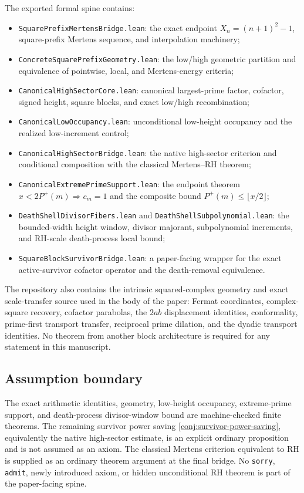 The exported formal spine contains:
\begin{itemize}
\item \texttt{SquarePrefixMertensBridge.lean}: the exact endpoint $X_n=(n+1)^2-1$, square-prefix Mertens sequence, and interpolation machinery;
\item \texttt{ConcreteSquarePrefixGeometry.lean}: the low/high geometric partition and equivalence of pointwise, local, and Mertens-energy criteria;
\item \texttt{CanonicalHighSectorCore.lean}: canonical largest-prime factor, cofactor, signed height, square blocks, and exact low/high recombination;
\item \texttt{CanonicalLowOccupancy.lean}: unconditional low-height occupancy and the realized low-increment control;
\item \texttt{CanonicalHighSectorBridge.lean}: the native high-sector criterion and conditional composition with the classical Mertens--RH theorem;
\item \texttt{CanonicalExtremePrimeSupport.lean}: the endpoint theorem $x<2P^+(m)\Rightarrow c_m=1$ and the composite bound $P^+(m)\le\lfloor x/2\rfloor$;
\item \texttt{DeathShellDivisorFibers.lean} and \texttt{DeathShellSubpolynomial.lean}: the bounded-width height window, divisor majorant, subpolynomial increments, and RH-scale death-process local bound;
\item \texttt{SquareBlockSurvivorBridge.lean}: a paper-facing wrapper for the exact active-survivor cofactor operator and the death-removal equivalence.
\end{itemize}

The repository also contains the intrinsic squared-complex geometry and exact scale-transfer source used in the body of the paper: Fermat coordinates, complex-square recovery, cofactor parabolas, the $2ab$ displacement identities, conformality, prime-first transport transfer, reciprocal prime dilation, and the dyadic transport identities.  No theorem from another block architecture is required for any statement in this manuscript.

\subsection{Assumption boundary}

The exact arithmetic identities, geometry, low-height occupancy, extreme-prime support, and death-process divisor-window bound are machine-checked finite theorems.  The remaining survivor power saving \cref{conj:survivor-power-saving}, equivalently the native high-sector estimate, is an explicit ordinary proposition and is not assumed as an axiom.  The classical Mertens criterion equivalent to RH is supplied as an ordinary theorem argument at the final bridge.  No \texttt{sorry}, \texttt{admit}, newly introduced axiom, or hidden unconditional RH theorem is part of the paper-facing spine.
